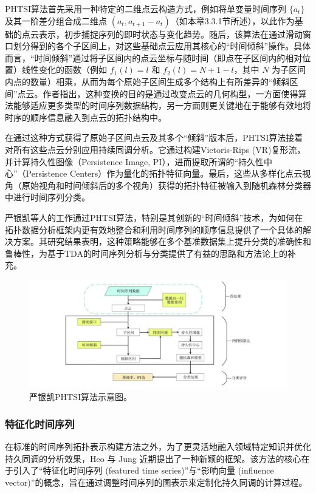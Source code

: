 PHTSI算法首先采用一种特定的二维点云构造方式，例如将单变量时间序列 $\{a_t\}$ 及其一阶差分组合成二维点 $(a_t, a_{t+1}-a_t)$（如本章3.3.1节所述），以此作为基础的点云表示，初步捕捉序列的即时状态与变化趋势。随后，该算法在通过滑动窗口划分得到的各个子区间上，对这些基础点云应用其核心的“时间倾斜”操作。具体而言，“时间倾斜”通过将子区间内的点云坐标与随时间（即点在子区间内的相对位置）线性变化的函数（例如 $f_1(l)=l$ 和 $f_2(l)=N+1-l$，其中 $N$ 为子区间内点的数量）相乘，从而为每个原始子区间生成多个结构上有所差异的“倾斜区间”点云。作者指出，这种变换的目的是通过改变点云的几何构型，一方面使得算法能够适应更多类型的时间序列数据结构，另一方面则更关键地在于能够有效地将时序的顺序信息融入到点云的拓扑结构中。

在通过这种方式获得了原始子区间点云及其多个“倾斜”版本后，PHTSI算法接着对所有这些点云分别应用持续同调分析。它通过构建Vietoris-Rips (VR)复形流，并计算持久性图像（Persistence Image, PI），进而提取所谓的“持久性中心”（Persistence Centers）作为量化的拓扑特征向量。最后，这些从多样化点云视角（原始视角和时间倾斜后的多个视角）获得的拓扑特征被输入到随机森林分类器中进行时间序列分类。

严银凯等人的工作通过PHTSI算法，特别是其创新的“时间倾斜”技术，为如何在拓扑数据分析框架内更有效地整合和利用时间序列的顺序信息提供了一个具体的解决方案。其研究结果表明，这种策略能够在多个基准数据集上提升分类的准确性和鲁棒性，为基于TDA的时间序列分析与分类提供了有益的思路和方法论上的补充。
\begin{figure}[thbp!]
    \centering
    \includegraphics[width=1.0\textwidth]{figure/严银凯示意图.png}
    \caption{严银凯PHTSI算法示意图。}
\end{figure}

\subsubsection{特征化时间序列}
在标准的时间序列拓扑表示构建方法之外，为了更灵活地融入领域特定知识并优化持久同调的分析效果，Heo 与 Jung \cite{2} 近期提出了一种新颖的框架。该方法的核心在于引入了“特征化时间序列 (featured time series)”与“影响向量 (influence vector)”的概念，旨在通过调整时间序列的图表示来定制化持久同调的计算过程。

